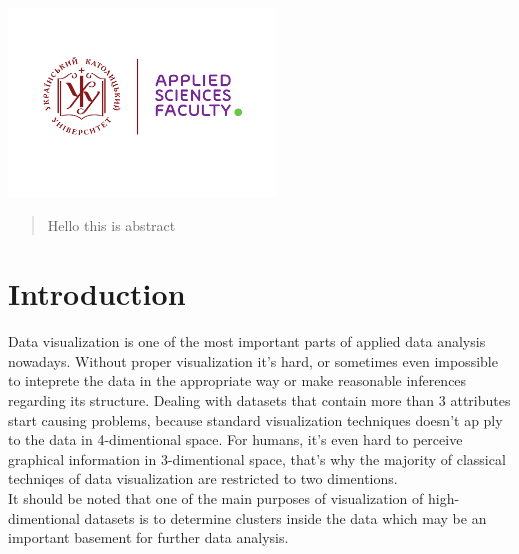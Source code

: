 \begin{titlepage}

\includegraphics[height=5cm]{UCU-Apps.png}\\[1cm] %
 

\vfill %

\end{titlepage}


\begin{abstract}
	
	Hello this is abstract
\end{abstract}

\section{Introduction}

Data visualization is one of the most important parts of applied data analysis nowadays. Without proper visualization it’s hard, or sometimes even impossible to inteprete the data in the appropriate way or make reasonable inferences regarding its structure. Dealing with datasets that contain more than 3 attributes start causing problems, because standard visualization techniques doesn’t ap ply to the data in 4-dimentional space. For humans, it’s even hard to perceive graphical information in 3-dimentional space, that’s why the majority of classical techniqes of data visualization are restricted to two dimentions. \\

It should be noted that one of the main purposes of visualization of high-dimentional datasets is to determine clusters inside the data which may be an important basement for further data analysis.


